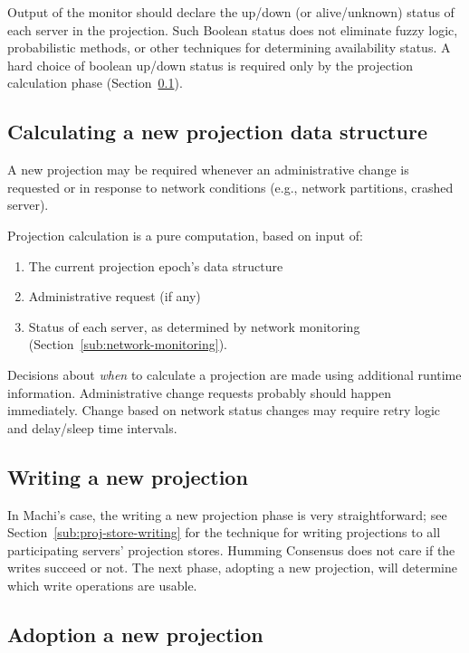 \documentclass[preprint,10pt]{sigplanconf}
\begin{document}
Output of the monitor should declare the up/down (or
alive/unknown) status of each server in the projection.  Such
Boolean status does not eliminate fuzzy logic, probabilistic
methods, or other techniques for determining availability status.
A hard choice of boolean up/down status
is required only by the projection calculation phase
(Section~\ref{sub:projection-calculation}).

\subsection{Calculating a new projection data structure}
\label{sub:projection-calculation}

A new projection may be
required whenever an administrative change is requested or in response
to network conditions (e.g., network partitions, crashed server).

Projection calculation is a pure computation, based on input of:

\begin{enumerate}
\item The current projection epoch's data structure
\item Administrative request (if any)
\item Status of each server, as determined by network monitoring
(Section~\ref{sub:network-monitoring}).
\end{enumerate}

Decisions about {\em when} to calculate a projection are made
using additional runtime information.  Administrative change requests
probably should happen immediately.  Change based on network status
changes may require retry logic and delay/sleep time intervals.

\subsection{Writing a new projection}
\label{sub:proj-storage-writing}

In Machi's case, the writing a new projection phase is very
straightforward; see
Section~\ref{sub:proj-store-writing} for the technique for writing
projections to all participating servers' projection stores.
Humming Consensus does not care
if the writes succeed or not.  The next phase, adopting a
new projection, will determine which write operations are usable.

\subsection{Adoption a new projection}
\label{sub:proj-adoption}
\end{document}
